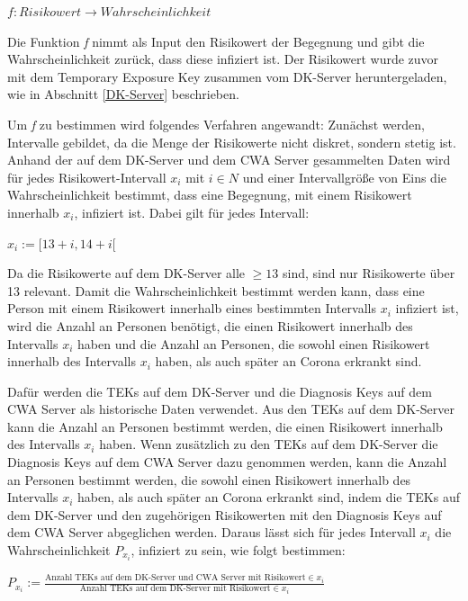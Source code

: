 \documentclass[conference,compsoc]{IEEEtran}
\begin{document}
\centerline{\text{ }}
\centerline{$f: Risikowert \rightarrow Wahrscheinlichkeit$}
\centerline{\text{ }}

Die Funktion \textit{f} nimmt als Input den Risikowert der Begegnung und gibt die Wahrscheinlichkeit zurück, dass diese infiziert ist.
Der Risikowert wurde zuvor mit dem Temporary Exposure Key zusammen vom DK-Server heruntergeladen, wie in Abschnitt \ref{DK-Server} beschrieben.

Um \textit{f} zu bestimmen wird folgendes Verfahren angewandt:
Zunächst werden, Intervalle gebildet, da die Menge der Risikowerte nicht diskret, sondern stetig ist.
Anhand der auf dem DK-Server und dem CWA Server gesammelten Daten wird für jedes Risikowert-Intervall 
$x_i$ mit $i \in N$ und einer Intervallgröße von Eins die Wahrscheinlichkeit bestimmt, 
dass eine Begegnung, mit einem Risikowert innerhalb $x_i$, infiziert ist. 
Dabei gilt für jedes Intervall:

\centerline{\text{ }}
\centerline{$x_i := [13+i, 14+i[$}
\centerline{\text{ }}

Da die Risikowerte auf dem DK-Server alle $\geq 13$ sind, sind nur Risikowerte über 13 relevant.
Damit die Wahrscheinlichkeit bestimmt werden kann, dass eine Person mit einem Risikowert innerhalb eines bestimmten Intervalls $x_i$ infiziert ist, 
wird die Anzahl an Personen benötigt, die einen Risikowert innerhalb des Intervalls $x_i$ haben und die Anzahl an Personen, 
die sowohl einen Risikowert innerhalb des Intervalls $x_i$ haben, als auch später an Corona erkrankt sind. 

Dafür werden die TEKs auf dem DK-Server und die Diagnosis Keys auf dem CWA Server als historische Daten verwendet.
Aus den TEKs auf dem DK-Server kann die Anzahl an Personen bestimmt werden, die einen Risikowert innerhalb des Intervalls $x_i$ haben.
Wenn zusätzlich zu den TEKs auf dem DK-Server die Diagnosis Keys auf dem CWA Server dazu genommen werden, 
kann die Anzahl an Personen bestimmt werden, die sowohl einen Risikowert innerhalb des Intervalls $x_i$ haben, als auch später an Corona erkrankt sind, 
indem die TEKs auf dem DK-Server und den zugehörigen Risikowerten mit den Diagnosis Keys auf dem CWA Server abgeglichen werden. 
Daraus lässt sich für jedes Intervall $x_i$ die Wahrscheinlichkeit $P_{x_i}$, infiziert zu sein, wie folgt bestimmen:

\centerline{\text{ }}
\centerline{$P_{x_i} := \frac{\text{Anzahl TEKs auf dem DK-Server und CWA Server mit Risikowert} \in x_i}{\text{Anzahl TEKs auf dem DK-Server mit Risikowert} \in x_i}$}
\centerline{\text{ }}
\end{document}
